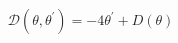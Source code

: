 \begin{equation}
\mathcal{D}\left( \theta ,\theta ^{\prime }\right) =-4\theta ^{\prime
}+D\left( \theta \right)  \label{solutree}
\end{equation}

